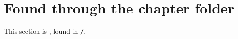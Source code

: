 \section{Found through the chapter folder}
This section is \verb||, found in \texttt{\thechapterdir/}.

